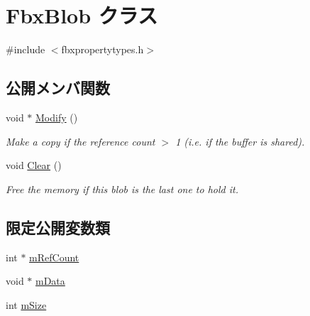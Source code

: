 \hypertarget{class_fbx_blob}{}\section{Fbx\+Blob クラス}
\label{class_fbx_blob}


{\ttfamily \#include $<$fbxpropertytypes.\+h$>$}

\subsection*{公開メンバ関数}
\begin{DoxyCompactItemize}
\item 
void $\ast$ \hyperlink{class_fbx_blob_a18bd3fbf233e39091ffcf0ef65123023}{Modify} ()
\begin{DoxyCompactList}\small\item\em Make a copy if the reference count $>$ 1 (i.\+e. if the buffer is shared). \end{DoxyCompactList}\item 
void \hyperlink{class_fbx_blob_abd720fef7ed5feacc8ef21d669e26cce}{Clear} ()
\begin{DoxyCompactList}\small\item\em Free the memory if this blob is the last one to hold it. \end{DoxyCompactList}\end{DoxyCompactItemize}
\subsection*{限定公開変数類}
\begin{DoxyCompactItemize}
\item 
int $\ast$ \hyperlink{class_fbx_blob_ac25ef6a057beb9d5f1d072a77833b910}{m\+Ref\+Count}
\item 
void $\ast$ \hyperlink{class_fbx_blob_af397c288f865eefa5e1fde8be443d9c2}{m\+Data}
\item 
int \hyperlink{class_fbx_blob_a3c92f0ad0ff306800df7be4d94ac7528}{m\+Size}
\end{DoxyCompactItemize}
